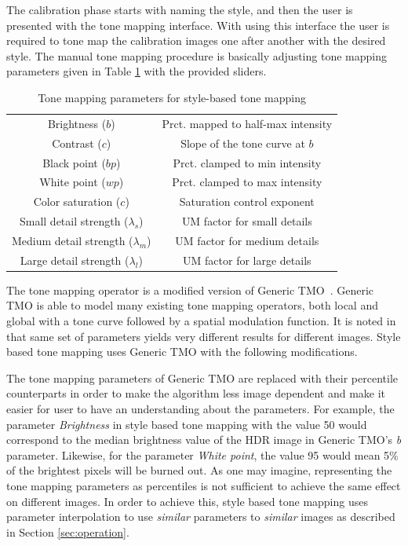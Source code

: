 The calibration phase starts with naming the style, and then the user is presented with the tone mapping interface. With using this interface the user is required to tone map the calibration images one after another with the desired style. The manual tone mapping procedure is basically adjusting tone mapping parameters given in Table \ref{tab:tonemap_parameters} with the provided sliders.

\begin{table}
\caption{Tone mapping parameters for style-based tone mapping}
\label{tab:tonemap_parameters}
\centering
\begin{tabular}{|c|c|}
\hline 
Brightness ($b$) & Prct. mapped to half-max intensity \\
Contrast ($c$) & Slope of the tone curve at $b$ \\
Black point ($bp$) & Prct. clamped to min intensity \\
White point ($wp$) & Prct. clamped to max intensity \\
Color saturation ($c$) & Saturation control exponent \\
\hline
Small detail strength ($\lambda_s$) & UM factor for small details \\
Medium detail strength ($\lambda_m$) & UM factor for medium details \\
Large detail strength ($\lambda_l$) & UM factor for large details \\
\hline
\end{tabular}
\end{table}

The tone mapping operator is a modified version of Generic TMO~\cite{mantiuk2008modeling}. Generic TMO is able to model many existing tone mapping operators, both local and global with a tone curve followed by a spatial modulation function. It is noted in~\cite{mantiuk2008modeling} that same set of parameters yields very different results for different images. Style based tone mapping uses Generic TMO with the following modifications.

The tone mapping parameters of Generic TMO are replaced with their percentile counterparts in order to make the algorithm less image dependent and make it easier for user to have an understanding about the parameters. For example, the parameter \emph{Brightness} in style based tone mapping with the value 50 would correspond to the median brightness value of the HDR image in Generic TMO's \emph{b} parameter. Likewise, for the parameter \emph{White point}, the value 95 would mean 5\% of the brightest pixels will be burned out. As one may imagine, representing the tone mapping parameters as percentiles is not sufficient to achieve the same effect on different images. In order to achieve this, style based tone mapping uses parameter interpolation to use \emph{similar} parameters to \emph{similar} images as described in Section \ref{sec:operation}. 

